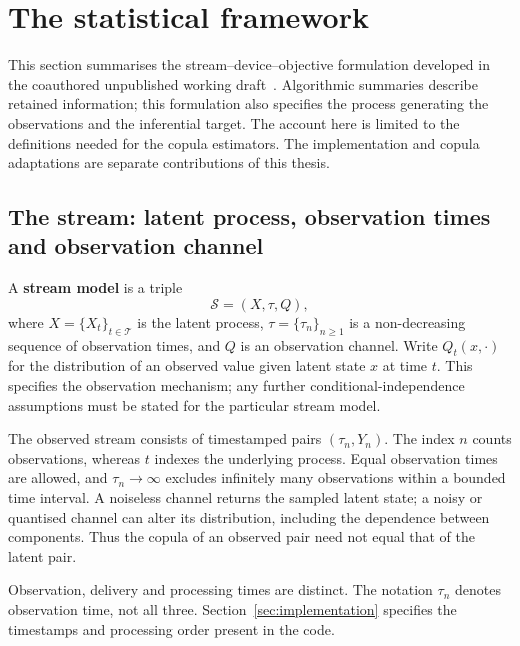 \section{The statistical framework}
\label{sec:streams-framework}
This section summarises the stream--device--objective formulation developed in the coauthored unpublished working draft~\cite{stream_device_objective_draft}. Algorithmic summaries describe retained information; this formulation also specifies the process generating the observations and the inferential target. The account here is limited to the definitions needed for the copula estimators. The implementation and copula adaptations are separate contributions of this thesis.

\subsection{The stream: latent process, observation times and observation channel}
A \textbf{stream model} is a triple
\[
 \mathcal S=(X,\tau,Q),
\]
where $X=\{X_t\}_{t\in\mathcal T}$ is the latent process, $\tau=\{\tau_n\}_{n\geq1}$ is a non-decreasing sequence of observation times, and $Q$ is an observation channel. Write $Q_t(x,\cdot)$ for the distribution of an observed value given latent state $x$ at time $t$. This specifies the observation mechanism; any further conditional-independence assumptions must be stated for the particular stream model.

The observed stream consists of timestamped pairs $(\tau_n,Y_n)$. The index $n$ counts observations, whereas $t$ indexes the underlying process. Equal observation times are allowed, and $\tau_n\to\infty$ excludes infinitely many observations within a bounded time interval. A noiseless channel returns the sampled latent state; a noisy or quantised channel can alter its distribution, including the dependence between components. Thus the copula of an observed pair need not equal that of the latent pair.

Observation, delivery and processing times are distinct. The notation $\tau_n$ denotes observation time, not all three. Section~\ref{sec:implementation} specifies the timestamps and processing order present in the code.

